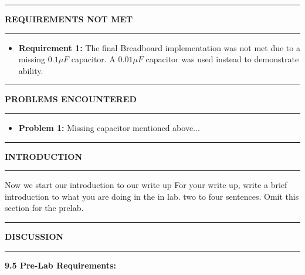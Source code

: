\documentclass{article}
\begin{document}

\begin{center}
    \hrule
    \vspace{0.2cm}
    \textbf{\large REQUIREMENTS NOT MET}
    \vspace{0.2cm}
    \hrule
\end{center}
\begin{itemize}
    \item \textbf{Requirement 1:} The final Breadboard implementation was not met due to a missing $0.1 \mu F$ capacitor. A $0.01\mu F$ capacitor was used instead to demonstrate ability.
\end{itemize}

\begin{center}
    \hrule
    \vspace{0.2cm}
    \textbf{\large PROBLEMS ENCOUNTERED}
    \vspace{0.2cm}
    \hrule
\end{center}
\begin{itemize}
    \item \textbf{Problem 1:} Missing capacitor mentioned above...
\end{itemize}

\begin{center}
    \hrule
    \vspace{0.2cm}
    \textbf{\large INTRODUCTION}
    \vspace{0.2cm}
    \hrule
\end{center}

Now we start our introduction to our write up
For your write up, write a brief introduction to what you are doing in the in lab. two to four sentences. 
Omit this section for the prelab.


\begin{center}
    \hrule
    \vspace{0.2cm}
    \textbf{\large DISCUSSION}
    \vspace{0.2cm}
    \hrule
\end{center}

\textbf{\large 9.5 Pre-Lab Requirements:}
\end{document}
